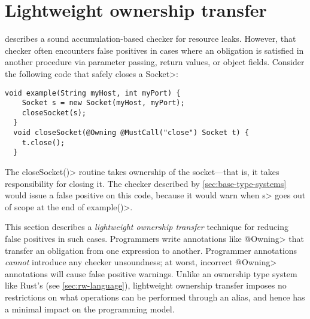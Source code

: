 \section{Lightweight ownership transfer}
\label{sec:lightweight-ownership}



 describes a sound accumulation-based
checker for resource leaks. However, that checker often encounters false
positives in cases where an \MustCall obligation is satisfied
in another procedure via parameter passing, return values, or object fields.
Consider the following code that safely closes a \<Socket>:

\begin{lstlisting}[frame=tb,belowskip=3mm]
  void example(String myHost, int myPort) {
    Socket s = new Socket(myHost, myPort);
    closeSocket(s);
  }
  void closeSocket(@Owning @MustCall("close") Socket t) {
    t.close();
  }  
\end{lstlisting}

The \<closeSocket()> routine takes ownership of the socket---that is,
it takes responsibility for closing it. The checker described by
\cref{sec:base-type-systems} would issue a false positive on this
code, because it would warn when \<s>
goes out of scope at the end of \<example()>.

This section describes a \emph{lightweight ownership transfer} technique for reducing
false positives in such cases.
Programmers write annotations like \<@Owning> that transfer an
obligation from one expression to another.
Programmer
annotations \emph{cannot} introduce any checker unsoundness; at worst,
incorrect \<@Owning> annotations will cause false positive warnings.
Unlike an ownership type system like Rust's (see \cref{sec:rw-language}),
lightweight ownership transfer imposes no restrictions on what operations can be performed
through an alias, and hence has a minimal impact on the programming model.

